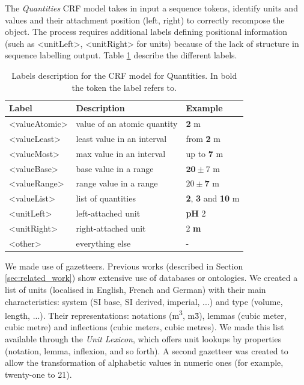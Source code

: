\documentclass[sigconf]{acmart}
\begin{document}
The \textit{Quantities} CRF model takes in input a sequence tokens, identify units and values and their attachment position (left, right) to correctly recompose the object. The process requires additional labels defining positional information (such as <unitLeft>, <unitRight> for units) because of the lack of structure in sequence labelling output. Table \ref{tab:quantities-model-labels} describe the different labels.

\begin{table}[ht]
  \caption{Labels description for the CRF model for Quantities. In bold the token the label refers to.}
  \label{tab:quantities-model-labels}
  \begin{tabular}{lll}
    \toprule
    Label & Description & Example\\
    \midrule
    <valueAtomic> & value of an atomic quantity & \textbf{2} m \\
    <valueLeast> & least value in an interval & from \textbf{2} m \\
    <valueMost> & max value in an interval & up to \textbf{7} m \\
    <valueBase> & base value in a range & $\textbf{20}\pm7$ m \\
    <valueRange> & range value in a range & $20 \pm \textbf{7}$ m \\
    <valueList> & list of quantities & \textbf{2}, \textbf{3} and \textbf{10} m \\
    <unitLeft> & left-attached unit & \textbf{pH} 2 \\
    <unitRight> & right-attached unit & 2 \textbf{m} \\
    <other> & everything else & - \\
  \bottomrule
\end{tabular}
\end{table}

We made use of gazetteers. Previous works (described in Section \ref{sec:related_work}) show extensive use of databases or ontologies. We created a list of units (localised in English, French and German) with their main characteristics: system (SI base, SI derived, imperial, ...) and type (volume, length, ...). Their representations: notations (m\textsuperscript{3}, m\^3), lemmas (cubic meter, cubic metre) and inflections (cubic meters, cubic metres). We made this list available through the \textit{Unit Lexicon}, which offers unit lookups by properties (notation, lemma, inflexion, and so forth). A second gazetteer was created to allow the transformation of alphabetic values in numeric ones (for example, twenty-one to 21).
\end{document}
